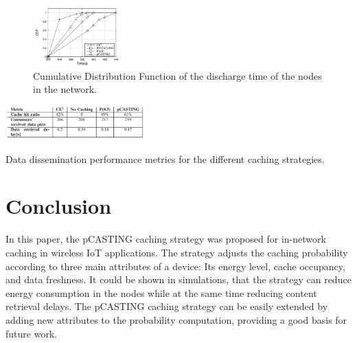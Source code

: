 \documentclass[conference]{IEEEtran}
\begin{document}
\begin{figure}
	\begin{center}
	\includegraphics[width=0.3\textwidth]{fig1.png}
	\end{center}

	\caption{Cumulative Distribution Function of the discharge time of the nodes in the network.}
	\label{fig}
\end{figure}

\begin{table}
	\begin{center}
		\includegraphics[width=0.4\textwidth]{tab1.png}
	\end{center}
	\caption{Data dissemination performance metrics for the different caching strategies.}
	\label{tab}
\end{table}

\section{Conclusion}
\label{sec:conclusion}

In this paper, the {pCASTING} caching strategy was proposed for in-network caching in wireless IoT applications. The strategy adjusts the caching probability according to three main attributes of a device: Its energy level, cache occupancy, and data freshness. It could be shown in simulations, that the strategy can reduce energy consumption in the nodes while at the same time reducing content retrieval delays. The {pCASTING} caching strategy can be easily extended by adding new attributes to the probability computation, providing a good basis for future work.

\printbibliography
\end{document}
